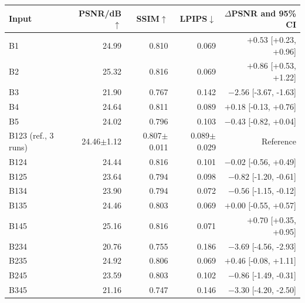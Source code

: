 \begin{tabular}{@{}lrrrr@{}}
\toprule
Input & PSNR/dB$\uparrow$ & SSIM$\uparrow$ & LPIPS$\downarrow$ & $\Delta$PSNR and 95\% CI\\
\midrule
B1 & 24.99 & 0.810 & 0.069 & $+0.53$ [+0.23, +0.96] \\
B2 & 25.32 & 0.816 & 0.069 & $+0.86$ [+0.53, +1.22] \\
B3 & 21.90 & 0.767 & 0.142 & $-2.56$ [-3.67, -1.63] \\
B4 & 24.64 & 0.811 & 0.089 & $+0.18$ [-0.13, +0.76] \\
B5 & 24.02 & 0.796 & 0.103 & $-0.43$ [-0.82, +0.04] \\
B123 (ref., 3 runs) & 24.46$\pm$1.12 & 0.807$\pm$0.011 & 0.089$\pm$0.029 & Reference \\
B124 & 24.44 & 0.816 & 0.101 & $-0.02$ [-0.56, +0.49] \\
B125 & 23.64 & 0.794 & 0.098 & $-0.82$ [-1.20, -0.61] \\
B134 & 23.90 & 0.794 & 0.072 & $-0.56$ [-1.15, -0.12] \\
B135 & 24.46 & 0.803 & 0.069 & $+0.00$ [-0.55, +0.57] \\
B145 & 25.16 & 0.816 & 0.071 & $+0.70$ [+0.35, +0.95] \\
B234 & 20.76 & 0.755 & 0.186 & $-3.69$ [-4.56, -2.93] \\
B235 & 24.92 & 0.806 & 0.069 & $+0.46$ [-0.08, +1.11] \\
B245 & 23.59 & 0.803 & 0.102 & $-0.86$ [-1.49, -0.31] \\
B345 & 21.16 & 0.747 & 0.146 & $-3.30$ [-4.20, -2.50] \\
\bottomrule
\end{tabular}
